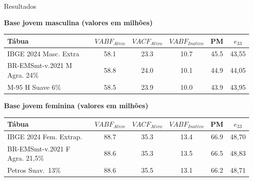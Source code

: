 \documentclass[aspectratio=169, 10pt]{beamer}
\begin{document}
\begin{frame}{Resultados}

      \centering\textbf{Base jovem masculina (valores em milhões)}\\[2pt]
      \begin{tabular}{lccccc}
        \toprule
        \textbf{Tábua} & $VABF_{Ativo}$ & $VACF_{Ativo}$ & $VABF_{Inativo}$ & PM & $e_{33}$ \\
        \midrule
        IBGE 2024 Masc. Extra            & 58.1 & 23.3 & 10.7 & 45.5 & 43,55 \\
        BR-EMSmt-v.2021 M Agra. 24\%     & 58.8 & 24.0 & 10.1 & 44.9 & 44,05 \\
        M-95 H Suave 6\%                 & 58.5 & 23.9 & 10.0 & 43.9 & 43,95 \\
        \bottomrule
      \end{tabular}

      \bigskip
      \centering\textbf{Base jovem feminina (valores em milhões)}\\[2pt]
      \begin{tabular}{lccccc}
        \toprule
        \textbf{Tábua} & $VABF_{Ativo}$ & $VACF_{Ativo}$ & $VABF_{Inativo}$ & PM & $e_{33}$ \\
        \midrule
        IBGE 2024 Fem. Extrap.         & 88.7 & 35.3 & 13.4 & 66.9 & 48,70 \\
        BR-EMSmt-v.2021 F Agra. 21,5\% & 88.6 & 35.3 & 13.5 & 66.5 & 48,83 \\
        Petros Suav.\ 13\%             & 88.6 & 35.5 & 13.1 & 66.2 & 48,71 \\
        \bottomrule
      \end{tabular}
\end{frame}
\end{document}
